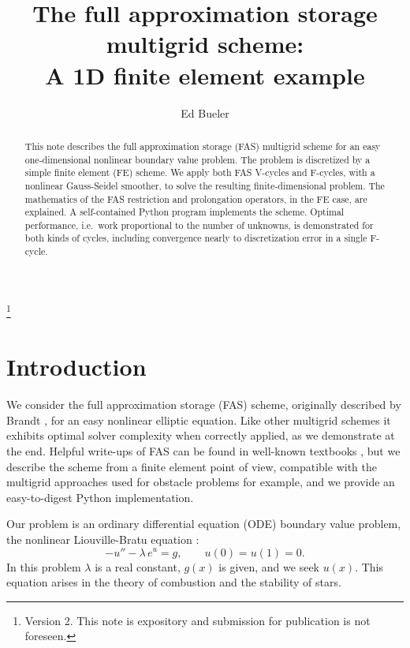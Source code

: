\documentclass[letterpaper,final,12pt,reqno]{amsart}
\begin{document}
\title[The FAS multigrid scheme]{The full approximation storage multigrid scheme: \\ A 1D finite element example}

\author{Ed Bueler}

\begin{abstract}  This note describes the full approximation storage (FAS) multigrid scheme for an easy one-dimensional nonlinear boundary value problem.  The problem is discretized by a simple finite element (FE) scheme.  We apply both FAS V-cycles and F-cycles, with a nonlinear Gauss-Seidel smoother, to solve the resulting finite-dimensional problem.  The mathematics of the FAS restriction and prolongation operators, in the FE case, are explained.  A self-contained Python program implements the scheme.  Optimal performance, i.e.~work proportional to the number of unknowns, is demonstrated for both kinds of cycles, including convergence nearly to discretization error in a single F-cycle.  \end{abstract}

\thanks{Version 2.  This note is expository and submission for publication is not foreseen.}

\maketitle

\tableofcontents

\thispagestyle{empty}
\bigskip

\section{Introduction}  \label{sec:intro}

We consider the full approximation storage (FAS) scheme, originally described by Brandt \cite{Brandt1977}, for an easy nonlinear elliptic equation.  Like other multigrid schemes it exhibits optimal solver complexity \cite{Bueler2021} when correctly applied, as we demonstrate at the end.  Helpful write-ups of FAS can be found in well-known textbooks \cite{BrandtLivne2011,Briggsetal2000,Trottenbergetal2001}, but we describe the scheme from a finite element point of view, compatible with the multigrid approaches used for obstacle problems \cite{GraeserKornhuber2009} for example, and we provide an easy-to-digest Python implementation.

Our problem is an ordinary differential equation (ODE) boundary value problem, the nonlinear Liouville-Bratu equation \cite{Bratu1914,Liouville1853}:
\begin{equation}
  -u'' - \lambda\, e^u = g,  \qquad u(0) = u(1) = 0.  \label{liouvillebratu}
\end{equation}
In this problem $\lambda$ is a real constant, $g(x)$ is given, and we seek $u(x)$.  This equation arises in the theory of combustion \cite{FrankKameneckij1955} and the stability of stars.
\end{document}
